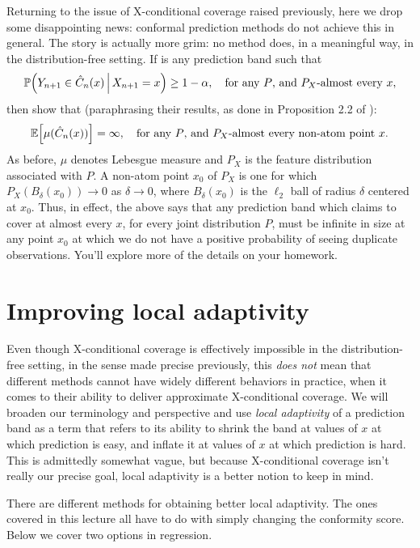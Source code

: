 \documentclass{article}
\begin{document}
Returning to the issue of X-conditional coverage raised previously, here we drop
some disappointing news: conformal prediction methods do not achieve this in
general. The story is actually more grim: no method does, in a meaningful
way, in the distribution-free setting. If  is any prediction band
such that  
\[
\mathbb{P}\Big( Y_{n+1} \in \hat{C}_n(x) \, \Big| \, X_{n+1} = x \Big) \geq 1-\alpha, \quad 
\text{for any $P$, and $P_X$-almost every $x$},
\]
then \citet{lei2014distribution, vovk2012conditional} show that (paraphrasing
their results, as done in Proposition 2.2 of \citet{barber2021limits}):
\[
\mathbb{E} \Big[ \mu(\hat{C}_n(x)) \Big] = \infty, \quad \text{for any $P$, and
  $P_X$-almost every non-atom point $x$}. 
\]
As before, $\mu$ denotes Lebesgue measure and $P_X$ is the feature distribution
associated with $P$. A non-atom point $x_0$ of $P_X$ is one for which
$P_X(B_\delta(x_0)) \to 0$ as $\delta \to 0$, where $B_\delta(x_0)$ is the
$\ell_2$ ball of radius $\delta$ centered at $x_0$. Thus, in effect, the above
says that any prediction band which claims to cover at almost every $x$, for
every joint distribution $P$, must be infinite in size at any point $x_0$ at
which we do not have a positive probability of seeing duplicate observations. 
You'll explore more of the details on your homework.  

\section{Improving local adaptivity}
\label{sec:local_adaptivity}

Even though X-conditional coverage is effectively impossible in the
distribution-free setting, in the sense made precise previously, this \emph{does
  not} mean that different methods cannot have widely different behaviors in
practice, when it comes to their ability to deliver approximate X-conditional
coverage. We will broaden our terminology and perspective and use \emph{local
  adaptivity} of a prediction band as a term that refers to its ability to
shrink the band at values of $x$ at which prediction is easy, and inflate it at
values of $x$ at which prediction is hard. This is admittedly somewhat vague,
but because X-conditional coverage isn't really our precise goal, local
adaptivity is a better notion to keep in mind.

There are different methods for obtaining better local adaptivity. The ones
covered in this lecture all have to do with simply changing the conformity
score. Below we cover two options in regression. 
\end{document}
